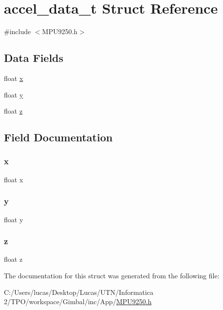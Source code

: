 \hypertarget{structaccel__data__t}{}\section{accel\+\_\+data\+\_\+t Struct Reference}
\label{structaccel__data__t}


{\ttfamily \#include $<$M\+P\+U9250.\+h$>$}

\subsection*{Data Fields}
\begin{DoxyCompactItemize}
\item 
float \mbox{\hyperlink{structaccel__data__t_ad0da36b2558901e21e7a30f6c227a45e}{x}}
\item 
float \mbox{\hyperlink{structaccel__data__t_aa4f0d3eebc3c443f9be81bf48561a217}{y}}
\item 
float \mbox{\hyperlink{structaccel__data__t_af73583b1e980b0aa03f9884812e9fd4d}{z}}
\end{DoxyCompactItemize}


\subsection{Field Documentation}
\mbox{\label{structaccel__data__t_ad0da36b2558901e21e7a30f6c227a45e}} 
\subsubsection{\texorpdfstring{x}{x}}
{\footnotesize\ttfamily float x}

\mbox{\label{structaccel__data__t_aa4f0d3eebc3c443f9be81bf48561a217}} 
\subsubsection{\texorpdfstring{y}{y}}
{\footnotesize\ttfamily float y}

\mbox{\label{structaccel__data__t_af73583b1e980b0aa03f9884812e9fd4d}} 
\subsubsection{\texorpdfstring{z}{z}}
{\footnotesize\ttfamily float z}



The documentation for this struct was generated from the following file\+:\begin{DoxyCompactItemize}
\item 
C\+:/\+Users/lucas/\+Desktop/\+Lucas/\+U\+T\+N/\+Informatica 2/\+T\+P\+O/workspace/\+Gimbal/inc/\+App/\mbox{\hyperlink{_m_p_u9250_8h}{M\+P\+U9250.\+h}}\end{DoxyCompactItemize}
